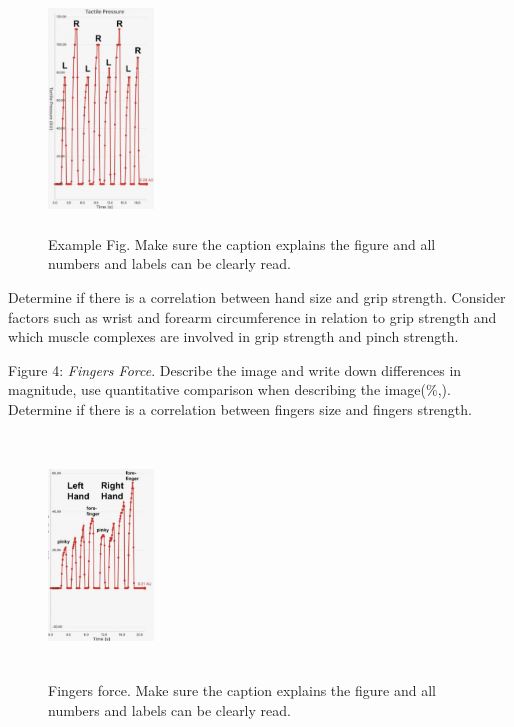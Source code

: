 \documentclass[journal]{IEEEtran}
\begin{document}
\begin{figure}[H]
\begin {center}
\includegraphics[width=0.25\textwidth,height=2.5333in]{images/dominant_no_dominant.png}
\caption{Example Fig. Make sure the caption explains the figure and all numbers and labels can be clearly read.}
\label{fig:dominant_hand}
\end {center}
\end{figure}

Determine if there is a correlation between hand size and grip strength. Consider factors such as wrist and forearm circumference in relation to grip strength and which muscle complexes are involved in grip strength and pinch strength.
    
Figure 4: {\it Fingers Force}.
Describe the image and write down differences in magnitude, use quantitative comparison when describing the image(\%,). \\
Determine if there is a correlation between fingers size and fingers strength. 

\begin{figure}[H]
\begin {center}
\includegraphics[width=0.25\textwidth,height=2.5333in]{images/fingers_force.png}
\caption{Fingers force. Make sure the caption explains the figure and all numbers and labels can be clearly read.}
\label{fig:fingers_force}
\end {center}
\end{figure}
\end{document}
